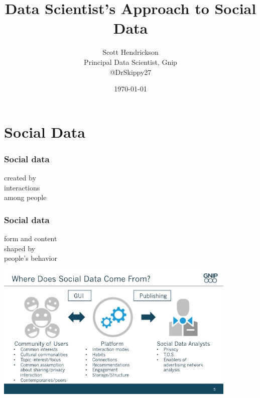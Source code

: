\documentclass{beamer}
\begin{document}
\title{Data Scientist's Approach to Social Data}
\author{Scott Hendrickson \\ Principal Data Scientist, Gnip \\  @DrSkippy27}
\date{\today} 


\begin{frame}
\titlepage
\end{frame}

\section{Social Data}
{
\begin{frame}
\textcolor{black} {
\hfill \Huge \insertsection}
\end{frame}
}

\begin{frame}\frametitle{Social data}
\begin{center}
{\Huge created by \\ [8pt] interactions \\ [15pt] among people}
\end{center}
\end{frame}

\begin{frame}\frametitle{Social data}
\begin{center}
{\Huge form and content \\ [8pt] shaped by \\ [15pt] people's behavior}
\end{center}
\end{frame}

\begin{frame}
  \begin{center}
    \includegraphics[height=6.5cm]{./imgs/wheredoessocialdatacomefrom.jpg}
  \end{center}
\end{frame}
\end{document}
